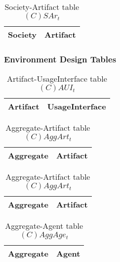 \begin{table}[H]
	\centering
	\begin{tabular}{|p{4cm}|p{8cm}|}
			\hline
			\textbf{Society} & \textbf{Artifact} \\
			\hline
			\hline
		\end{tabular}
	\caption{Society-Artifact table $(C)SAr_t$}
	\label{tab:csart}
\end{table}

\subsubsection{Environment Design Tables}

\begin{table}[H]
	\centering
	\begin{tabular}{|p{4cm}|p{8cm}|}
			\hline
			\textbf{Artifact} & \textbf{UsageInterface} \\
			\hline
			\hline
		\end{tabular}
	\caption{Artifact-UsageInterface table $(C)AUI_t$}
	\label{tab:cauit}
\end{table}

\begin{table}[H]
	\centering
	\begin{tabular}{|p{4cm}|p{8cm}|}
			\hline
			\textbf{Aggregate} & \textbf{Artifact} \\
			\hline
			\hline
		\end{tabular}
	\caption{Aggregate-Artifact table $(C)AggArt_t$}
	\label{tab:caggartt}
\end{table}

\begin{table}[H]
	\centering
	\begin{tabular}{|p{4cm}|p{8cm}|}
			\hline
			\textbf{Aggregate} & \textbf{Artifact} \\
			\hline
			\hline
		\end{tabular}
	\caption{Aggregate-Artifact table $(C)AggArt_t$}
	\label{tab:caggartt}
\end{table}

\begin{table}[H]
	\centering
	\begin{tabular}{|p{4cm}|p{8cm}|}
			\hline
			\textbf{Aggregate} & \textbf{Agent} \\
			\hline
			\hline
		\end{tabular}
	\caption{Aggregate-Agent table $(C)AggAge_t$}
	\label{tab:caggaget}
\end{table}

